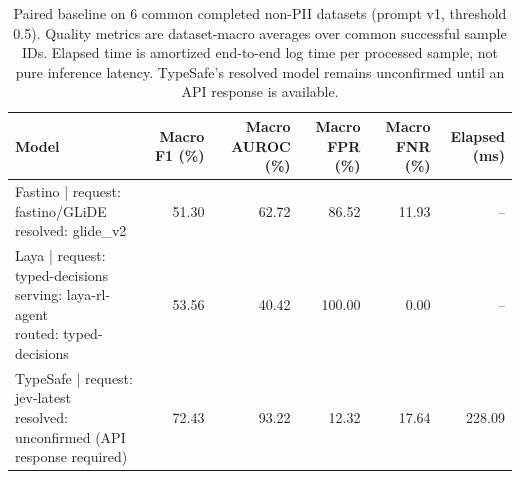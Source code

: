 \begin{table}[t]
\centering
\small
\begin{tabular}{lrrrrr}
\toprule
Model & Macro F1 (\%) & Macro AUROC (\%) & Macro FPR (\%) & Macro FNR (\%) & Elapsed (ms) \\
\midrule
\shortstack[l]{Fastino | request: fastino/GLiDE\\resolved: glide\_v2} & 51.30 & 62.72 & 86.52 & 11.93 & -- \\
\shortstack[l]{Laya | request: typed-decisions\\serving: laya-rl-agent\\routed: typed-decisions} & 53.56 & 40.42 & 100.00 & 0.00 & -- \\
\shortstack[l]{TypeSafe | request: jev-latest\\resolved: unconfirmed (API response required)} & 72.43 & 93.22 & 12.32 & 17.64 & 228.09 \\
\bottomrule
\end{tabular}
\caption{Paired baseline on 6 common completed non-PII datasets (prompt v1, threshold 0.5). Quality metrics are dataset-macro averages over common successful sample IDs. Elapsed time is amortized end-to-end log time per processed sample, not pure inference latency. TypeSafe's resolved model remains unconfirmed until an API response is available.}
\label{tab:model-comparison}
\end{table}
